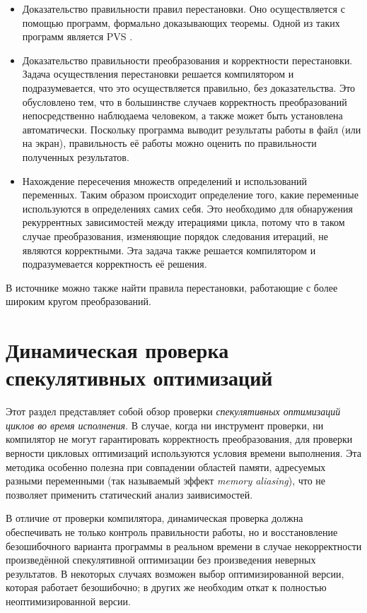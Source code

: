 \begin{itemize}
	\item Доказательство правильности правил перестановки. Оно осуществляется с помощью программ, формально доказывающих теоремы. Одной из таких программ является PVS \cite{SOR93}.
	\item Доказательство правильности преобразования и корректности перестановки. Задача осуществления перестановки решается компилятором и подразумевается, что это осуществляется правильно, без доказательства. Это обусловлено тем, что в большинстве случаев корректность преобразований непосредственно наблюдаема человеком, а также может быть установлена автоматически. Поскольку программа выводит результаты работы в файл (или на экран), правильность её работы можно оценить по правильности полученных результатов.
	\item Нахождение пересечения множеств определений и использований переменных. Таким образом происходит определение того, какие переменные используются в определениях самих себя. Это необходимо для обнаружения рекуррентных зависимостей между итерациями цикла, потому что в таком случае преобразования, изменяющие порядок следования итераций, не являются корректными. Эта задача также решается компилятором и подразумевается корректность её решения.
\end{itemize}

В источнике \cite{ZPL00} можно также найти правила перестановки, работающие с более широким кругом преобразований.

\section{Динамическая проверка спекулятивных оптимизаций}

Этот раздел представляет собой обзор проверки \emph{спекулятивных оптимизаций циклов во время исполнения}. В случае, когда ни инструмент проверки, ни компилятор не могут гарантировать корректность преобразования, для проверки верности цикловых оптимизаций используются условия времени выполнения. Эта методика особенно полезна при совпадении областей памяти, адресуемых разными переменными (так называемый эффект \emph{memory aliasing}), что не позволяет применить статический анализ заивисимостей.

В отличие от проверки компилятора, динамическая проверка должна обеспечивать не только контроль правильности работы, но и восстановление безошибочного варианта программы в реальном времени в случае некорректности произведённой спекулятивной оптимизации без произведения неверных результатов. В некоторых случаях возможен выбор оптимизированной версии, которая работает безошибочно; в других же необходим откат к полностью неоптимизированной версии.

